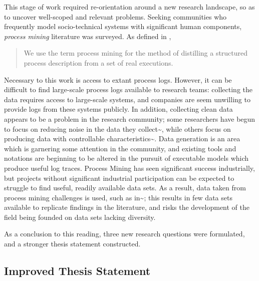 \documentclass[11pt]{article}
\begin{document}
This stage of work required re-orientation around a new research landscape, so
as to uncover well-scoped and relevant problems. Seeking communities who
frequently model socio-technical systems with significant human components,
\emph{process mining} literature was surveyed. As defined in
\cite{process_mining_research_agenda},

\begin{quote}
We use the term process mining for the method of distilling a structured process
description from a set of real executions.
\end{quote}

 Necessary to this work is access to
extant process logs. However, it can be difficult to find large-scale process
logs available to research teams: collecting the data requires access to
large-scale systems, and companies are seem unwilling to provide logs from these
systems publicly. In addition, collecting clean data appears to be a problem in
the research community; some researchers have begun to focus on reducing noise
in the data they collect\textasciitilde{}\cite{log_noise_removal}, while others focus on
producing data with controllable
characteristics\textasciitilde{}\cite{secsy,on_bp_variant_generation}. Data generation is an
area which is garnering some attention in the community, and existing tools and
notations are beginning to be altered in the pursuit of executable models which
produce useful log traces\cite{aalst_generating_logs}. Process Mining has seen
significant success industrially\cite{threegoodreasons}, but projects without
significant industrial participation can be expected to struggle to find useful,
readily available data sets. As a result, data taken from process mining
challenges is used, such as in\textasciitilde{}\cite{mattia_sts}; this results in few data sets
available to replicate findings in the literature, and risks the development of
the field being founded on data sets lacking diversity.





As a conclusion to this reading, three new research questions were formulated,
and a stronger thesis statement constructed.

\subsection{Improved Thesis Statement}
\label{sec:orgd0793a5}
\label{subsec:improved_thesis_statement}
\end{document}
